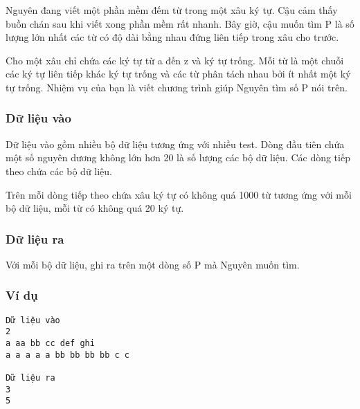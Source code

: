 



   Nguyên đang viết một phần mềm đếm từ trong một xâu ký tự. Cậu cảm thấy buồn chán sau khi viết xong phần mềm rất nhanh. Bây giờ, cậu muốn tìm P là số lượng lớn nhất các từ có độ dài bằng nhau đứng liên tiếp trong xâu cho trước.  

   Cho một xâu chỉ chứa các ký tự từ a đến z và ký tự trống. Mỗi từ là một chuỗi các ký tự liên tiếp khác ký tự trống và các từ phân tách nhau bởi ít nhất một ký tự trống. Nhiệm vụ của bạn là viết chương trình giúp Nguyên tìm số P nói trên.  

\subsubsection{   Dữ liệu vào  }

   Dữ liệu vào gồm nhiều bộ dữ liệu tương ứng với nhiều test. Dòng đầu tiên chứa một số nguyên dương không lớn hơn 20 là số lượng các bộ dữ liệu. Các dòng tiếp theo chứa các bộ dữ liệu.  

   Trên mỗi dòng tiếp theo chứa xâu ký tự có không quá 1000 từ tương ứng với mỗi bộ dữ liệu, mỗi từ có không quá 20 ký tự.  

\subsubsection{   Dữ liệu ra  }

   Với mỗi bộ dữ liệu, ghi ra trên một dòng số P mà Nguyên muốn tìm.  

\subsubsection{   Ví dụ  }
\begin{verbatim}
Dữ liệu vào
2
a aa bb cc def ghi
a a a a a bb bb bb bb c c	

Dữ liệu ra
3
5
\end{verbatim}